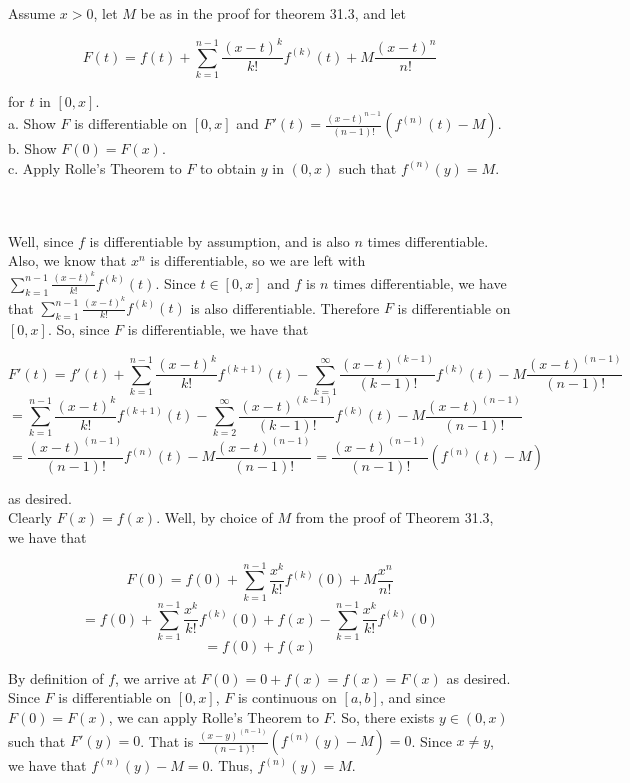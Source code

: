 Assume $x>0$, let $M$ be as in the proof for theorem 31.3, and let

$$F(t)=f(t)+\sum_{k=1}^{n-1}\frac{(x-t)^k}{k!}f^{(k)}(t)+M\frac{(x-t)^n}{n!}$$

for $t$ in $[0,x]$.\\

a. Show $F$ is differentiable on $[0,x]$ and $F'(t)=\frac{(x-t)^{n-1}}{(n-1)!}(f^{(n)}(t)-M)$.\\

b. Show $F(0)=F(x)$.\\

c. Apply Rolle's Theorem to $F$ to obtain $y$ in $(0,x)$ such that $f^{(n)}(y)=M$.\\\\

\begin{solution}\renewcommand{\qedsymbol}{}\ \\
    Well, since $f$ is differentiable by assumption, and is also $n$ times differentiable. Also, we know
    that $x^n$ is differentiable, so we are left with $\sum_{k=1}^{n-1}\frac{(x-t)^k}{k!}f^{(k)}(t)$.
    Since $t\in[0,x]$ and $f$ is $n$ times differentiable, we have that
    $\sum_{k=1}^{n-1}\frac{(x-t)^k}{k!}f^{(k)}(t)$ is also differentiable. Therefore $F$ is
    differentiable on $[0,x]$. So, since $F$ is differentiable, we have that
    
    $$F'(t)=f'(t)+\sum_{k=1}^{n-1}\frac{(x-t)^k}{k!}f^{(k+1)}(t)
    -\sum_{k=1}^{\infty}\frac{(x-t)^{(k-1)}}{(k-1)!}f^{(k)}(t)-M\frac{(x-t)^{(n-1)}}{(n-1)!}$$
    $$=\sum_{k=1}^{n-1}\frac{(x-t)^k}{k!}f^{(k+1)}(t)
    -\sum_{k=2}^{\infty}\frac{(x-t)^{(k-1)}}{(k-1)!}f^{(k)}(t)-M\frac{(x-t)^{(n-1)}}{(n-1)!}$$
    $$=\frac{(x-t)^{(n-1)}}{(n-1)!}f^{(n)}(t)-M\frac{(x-t)^{(n-1)}}{(n-1)!}
    =\frac{(x-t)^{(n-1)}}{(n-1)!}(f^{(n)}(t)-M)$$
    
    as desired.\\

    Clearly $F(x)=f(x)$. Well, by choice of $M$ from the proof of Theorem 31.3, we have that
    
    $$F(0)=f(0)+\sum_{k=1}^{n-1}\frac{x^k}{k!}f^{(k)}(0)+M\frac{x^n}{n!}$$
    $$=f(0)+\sum_{k=1}^{n-1}\frac{x^k}{k!}f^{(k)}(0)+f(x)-\sum_{k=1}^{n-1}\frac{x^k}{k!}f^{(k)}(0)$$
    $$=f(0)+f(x)$$
    
    By definition of $f$, we arrive at $F(0)=0+f(x)=f(x)=F(x)$ as desired.\\

    Since $F$ is differentiable on $[0,x]$, $F$ is continuous on $[a,b]$, and since $F(0)=F(x)$, we can
    apply Rolle's Theorem to $F$. So, there exists $y\in(0,x)$ such that $F'(y)=0$. That is
    $\frac{(x-y)^{(n-1)}}{(n-1)!}(f^{(n)}(y)-M)=0$. Since $x\neq y$, we have that $f^{(n)}(y)-M=0$.
    Thus, $f^{(n)}(y)=M$.

\end{solution}